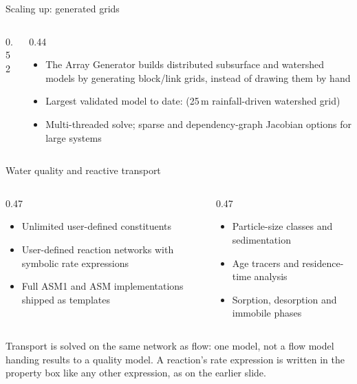 \documentclass[aspectratio=169, 10pt]{beamer}
\begin{document}
\begin{frame}{Scaling up: generated grids}
  \begin{columns}[T,onlytextwidth]
    \begin{column}{0.52\textwidth}
    \end{column}
    \begin{column}{0.44\textwidth}
      \begin{itemize}\setlength\itemsep{3pt}
        \item The \alert{Array Generator} builds distributed subsurface and
              watershed models by generating block/link grids, instead of
              drawing them by hand
        \item Largest validated model to date:
               (25\,m rainfall-driven
              watershed grid)
        \item Multi-threaded solve; sparse and dependency-graph Jacobian
              options for large systems
      \end{itemize}
    \end{column}
  \end{columns}
\end{frame}

\begin{frame}{Water quality and reactive transport}
  \begin{columns}[T,onlytextwidth]
    \begin{column}{0.47\textwidth}
      \begin{itemize}\setlength\itemsep{5pt}
        \item \alert{Unlimited} user-defined constituents
        \item User-defined reaction networks with symbolic rate expressions
        \item Full ASM1 and ASM implementations shipped as templates
      \end{itemize}
    \end{column}
    \begin{column}{0.47\textwidth}
      \begin{itemize}\setlength\itemsep{5pt}
        \item Particle-size classes and sedimentation
        \item Age tracers and residence-time analysis
        \item Sorption, desorption and immobile phases
      \end{itemize}
    \end{column}
  \end{columns}
  \vspace{1.0em}
  {\footnotesize Transport is solved on the \alert{same network as flow}: one
  model, not a flow model handing results to a quality model. A reaction's rate
  expression is written in the property box like any other expression, as on
  the earlier slide.}
\end{frame}
\end{document}
